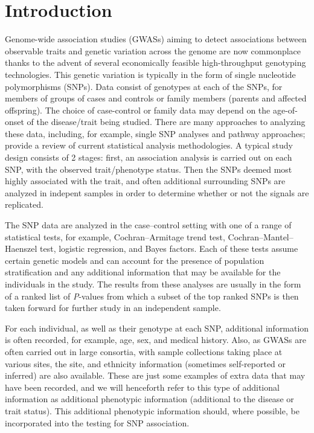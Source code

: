 \documentclass[oupdraft]{bio}
\begin{document}
\section{Introduction}
\label{sec1}

Genome-wide association studies (GWASs) aiming to detect
associations between observable traits and genetic variation
across the genome are now commonplace thanks to the advent of
several economically feasible high-throughput genotyping
technologies. This genetic variation is typically in the form of
single nucleotide polymorphisms (SNPs). Data consist of genotypes
at each of the SNPs, for members of groups of cases and controls
or family members (parents and affected offspring). The choice
of case-control or family data may depend on the age-of-onset
of the disease/trait being studied. There are many approaches to
analyzing these data, including, for example, single SNP
analyses and pathway approaches;
\citet{allison2006}
provide a review of current statistical analysis methodologies.
A typical study design consists of 2 stages: first, an association
analysis is carried out on each SNP, with the observed trait/phenotype
status. Then the SNPs deemed most highly associated with the trait,
and often additional surrounding SNPs are analyzed in indepent
samples in order to determine whether or not the signals are
replicated.

The SNP data are analyzed in the case--control setting with one of a
range of statistical tests, for example, Cochran--Armitage trend
test, Cochran--Mantel--Haenszel test, logistic regression, and
Bayes factors. Each of these tests assume certain genetic models
and can account for the presence of population stratification and
any additional information that may be available for the individuals
in the study. The results from these analyses are usually in the
form of a ranked list of \textit{P}-values from which a subset of
the top ranked SNPs is then taken forward for further study in an
independent sample.

For each individual, as well as their genotype at each SNP,
additional information is often recorded, for example, age, sex,
and medical history. Also, as GWASs are often carried out
in large consortia, with sample collections taking place at
various sites, the site, and ethnicity information (sometimes
self-reported or inferred) are also available. These are just some
examples of extra data that may have been recorded, and we will
henceforth refer to this type of additional information as
additional phenotypic information (additional to the disease or
trait status). This additional phenotypic information should,
where possible, be incorporated into the testing for SNP
association.
\end{document}

